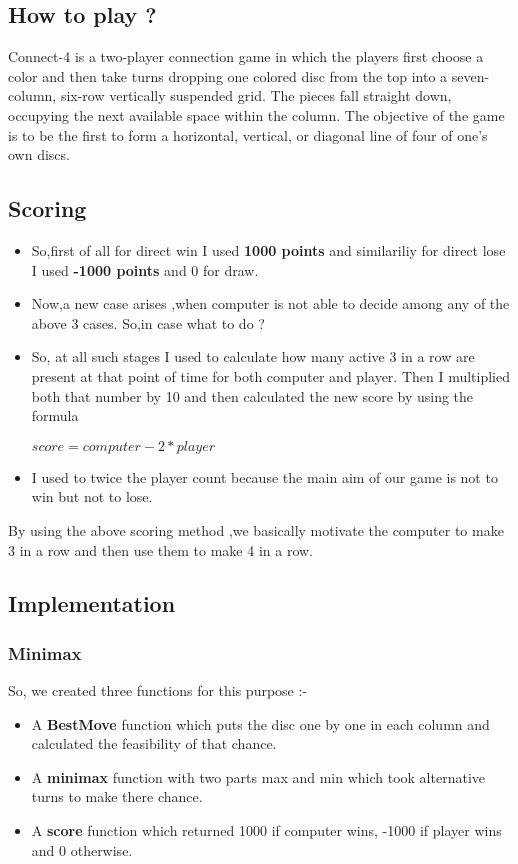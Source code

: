 \documentclass[11pt]{article}
\begin{document}
\subsection{How to play ?}
 \quad Connect-4 is a two-player connection game in which the players first choose a color and then take turns dropping one colored disc from the top into a seven-column, six-row vertically suspended grid. The pieces fall straight down, occupying the next available space within the column. The objective of the game is to be the first to form a horizontal, vertical, or diagonal line of four of one's own discs. 

\subsection{Scoring}
\begin{itemize}
\item So,first of all for direct win I used \textbf{1000 points} and similariliy for direct lose I used \textbf{-1000 points} and 0 for draw.
\item  Now,a new case arises ,when computer is not able to decide among any of the above 3 cases. So,in case what to do ?
\item So, at all such stages I used to calculate how many active 3 in a row are present at that point of time for both computer and player.
Then I multiplied both that number by 10 and then calculated the new score by using the formula
\begin{center}
    $score=computer- 2*player$
\end{center}

\item I used to twice the player count because the main aim of our game is not to win but not to lose.\linebreak

\end{itemize}
By using the above scoring  method ,we basically motivate the computer to make 3 in a row and then use them to make 4 in a row.
\subsection{Implementation}
\subsubsection{Minimax}
So, we created three functions for this purpose :-
\begin{itemize}
\item A \textbf{BestMove} function which puts the disc one by one in each column and calculated the feasibility of that chance.
\item A \textbf{minimax} function with two parts max and min which took alternative turns to make there chance.
\item A \textbf{score} function which returned 1000 if computer wins, -1000 if player wins and 0 otherwise.
\end{itemize}
\end{document}
